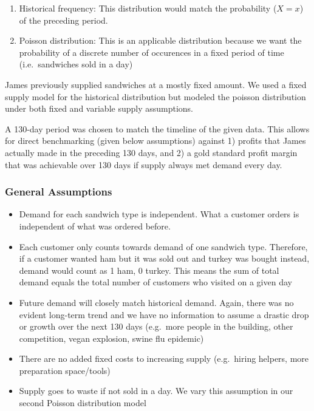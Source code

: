 \documentclass[]{article}
\begin{document}
\begin{enumerate}
\def\labelenumi{\arabic{enumi}.}
\item
  Historical frequency: This distribution would match the probability
  ($X=x$) of the preceding period.
\item
  Poisson distribution: This is an applicable distribution because we
  want the probability of a discrete number of occurences in a fixed
  period of time (i.e.~sandwiches sold in a day)
\end{enumerate}

James previously supplied sandwiches at a mostly fixed amount. We used a
fixed supply model for the historical distribution but modeled the
poisson distribution under both fixed and variable supply assumptions.

A 130-day period was chosen to match the timeline of the given data.
This allows for direct benchmarking (given below assumptions) against 1)
profits that James actually made in the preceding 130 days, and 2) a
gold standard profit margin that was achievable over 130 days if supply
always met demand every day.

\subsubsection{General Assumptions}\label{general-assumptions}

\begin{itemize}
\itemsep1pt\parskip0pt
\item
  Demand for each sandwich type is independent. What a customer orders
  is independent of what was ordered before.
\item
  Each customer only counts towards demand of one sandwich type.
  Therefore, if a customer wanted ham but it was sold out and turkey was
  bought instead, demand would count as 1 ham, 0 turkey. This means the
  sum of total demand equals the total number of customers who visited
  on a given day
\item
  Future demand will closely match historical demand. Again, there was
  no evident long-term trend and we have no information to assume a
  drastic drop or growth over the next 130 days (e.g.~more people in the
  building, other competition, vegan explosion, swine flu epidemic)
\item
  There are no added fixed costs to increasing supply (e.g.~hiring
  helpers, more preparation space/tools)
\item
  Supply goes to waste if not sold in a day. We vary this assumption in
  our second Poisson distribution model\\
\end{itemize}
\end{document}
